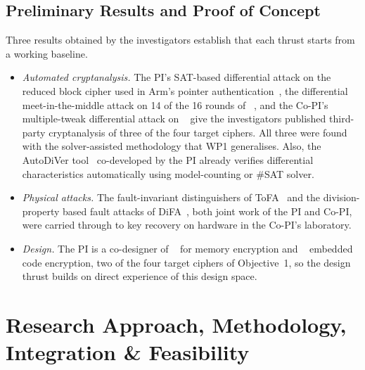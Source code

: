 \subsection{Preliminary Results and Proof of Concept}

Three results obtained by the investigators establish that each thrust starts from a working baseline.

\begin{itemize}
    \item \emph{Automated cryptanalysis.} The PI's SAT-based differential attack on the reduced  block cipher used in Arm's pointer authentication~, the differential meet-in-the-middle attack on 14 of the 16 rounds of ~, and the Co-PI's multiple-tweak differential attack on ~ give the investigators published third-party cryptanalysis of three of the four target ciphers.
All three were found with the solver-assisted methodology that WP1 generalises. Also, the \textsf{AutoDiVer} tool~ co-developed by the PI already verifies differential characteristics automatically using model-counting or \#SAT solver.

\item \emph{Physical attacks.} The fault-invariant distinguishers of \textsf{ToFA}~ and the division-property based fault attacks of \textsf{DiFA}~, both joint work of the PI and Co-PI, were carried through to key recovery on hardware in the Co-PI's laboratory.

\item \emph{Design.} The PI is a co-designer of ~ for memory encryption and ~ embedded code encryption, two of the four target ciphers of Objective~1, so the design thrust builds on direct experience of this design space.
\end{itemize}


\section{Research Approach, Methodology, Integration \& Feasibility}

